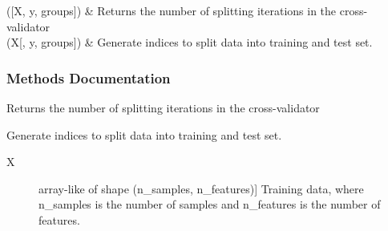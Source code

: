 \documentclass[letterpaper,10pt,english]{sphinxmanual}
\begin{document}
\begin{fulllineitems}
\begin{savenotes}
\begin{longtable}[c]{}
\endlastfoot

{\hyperref[\detokenize{api/mastml.data_splitters.LeaveCloseCompositionsOut:mastml.data_splitters.LeaveCloseCompositionsOut.get_n_splits}]{}}({[}X, y, groups{]})
&
Returns the number of splitting iterations in the cross-validator
\\
\hline
{\hyperref[\detokenize{api/mastml.data_splitters.LeaveCloseCompositionsOut:mastml.data_splitters.LeaveCloseCompositionsOut.split}]{}}(X{[}, y, groups{]})
&
Generate indices to split data into training and test set.
\\
\hline
\end{longtable}\sphinxatlongtableend\end{savenotes}
\subsubsection*{Methods Documentation}

\begin{fulllineitems}
\label{\detokenize{api/mastml.data_splitters.LeaveCloseCompositionsOut:mastml.data_splitters.LeaveCloseCompositionsOut.get_n_splits}}
Returns the number of splitting iterations in the cross-validator

\end{fulllineitems}


\begin{fulllineitems}
\label{\detokenize{api/mastml.data_splitters.LeaveCloseCompositionsOut:mastml.data_splitters.LeaveCloseCompositionsOut.split}}
Generate indices to split data into training and test set.
\begin{description}
\item[{X}] \leavevmode{[}array-like of shape (n\_samples, n\_features){]}
Training data, where n\_samples is the number of samples
and n\_features is the number of features.


\end{description}
\end{fulllineitems}
\end{fulllineitems}
\end{document}
